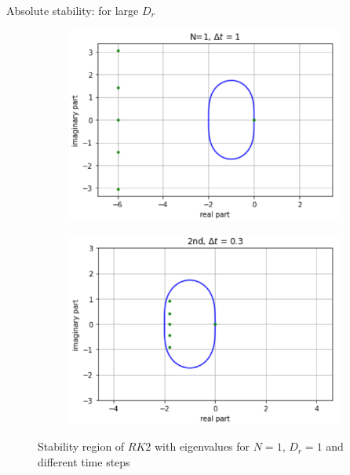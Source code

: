 \begin{frame}{Absolute stability: for large $D_r$}
	\begin{figure}
		\begin{subfigure}{0.48\textwidth}
			\includegraphics[width=\linewidth]{Bilder_wx/Stability/RK2_region_2nd_dr=1_dt=1}
		\end{subfigure}
		\hfill
		\begin{subfigure}{0.48\textwidth}
			\includegraphics[width=\linewidth]{Bilder_wx/Stability/RK2_region_2nd_dr=1_dt=0.3}
		\end{subfigure}
		\caption{Stability region of $RK2$ with eigenvalues for $N=1$, $D_r=1$ and different time steps}
	\end{figure}
\end{frame}

